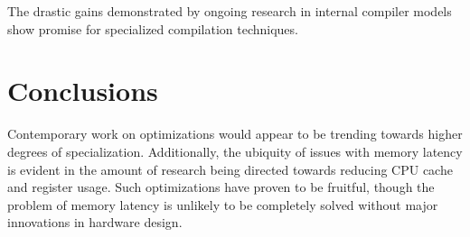 \documentclass[nobib]{tufte-handout}
\begin{document}
The drastic gains demonstrated by ongoing research in internal compiler models show promise for specialized compilation techniques.

\section{Conclusions}
Contemporary work on optimizations would appear to be trending towards higher degrees of specialization.  Additionally, the ubiquity of issues with memory latency is evident in the amount of research being directed towards reducing CPU cache and register usage.  Such optimizations have proven to be fruitful, though the problem of memory latency is unlikely to be completely solved without major innovations in hardware design.





\newpage
\nocite{*}


\end{document}
